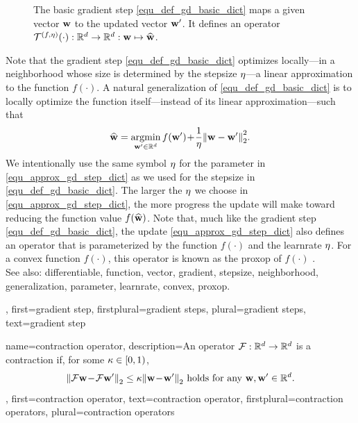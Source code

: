 {{\begin{figure}[H]
\begin{center}
\begin{tikzpicture}[scale=0.8]
				\end{tikzpicture}
			\end{center}
			\caption{The basic \gls{gradient} step \eqref{equ_def_gd_basic_dict} maps a given \gls{vector} $\weights$ 
			to the updated \gls{vector} $\weights'$. It defines an operator 
			$\mathcal{T}^{(f,\lrate)}(\cdot): \mathbb{R}^{\nrfeatures} \rightarrow \mathbb{R}^{\nrfeatures}:
			 \weights \mapsto \widehat{\weights}$.}
			\label{fig_basic_GD_step_single_dict}
		\end{figure}
		Note that the \gls{gradient} step \eqref{equ_def_gd_basic_dict} optimizes locally—in a \gls{neighborhood} whose size is 
		determined by the \gls{stepsize} $\lrate$—a linear approximation 
		to the \gls{function} $f(\cdot)$. A natural \gls{generalization} of \eqref{equ_def_gd_basic_dict} is to locally 
		optimize the \gls{function} itself—instead of its linear approximation—such that
		\begin{align} 
		\label{equ_approx_gd_step_dict}
		\widehat{\weights} = \argmin_{\weights' \in \mathbb{R}^{\dimlocalmodel}} f(\weights')\!+\!\frac{1}{\lrate}\normgeneric{\weights-\weights'}{2}^2. 
		\end{align}
		We intentionally use the same symbol $\lrate$ for the \gls{parameter} in \eqref{equ_approx_gd_step_dict} 
		as we used for the \gls{stepsize} in \eqref{equ_def_gd_basic_dict}. The larger the $\lrate$ we choose in 
		\eqref{equ_approx_gd_step_dict}, the more progress the update will make toward reducing the 
		\gls{function} value $f(\widehat{\weights})$. Note that, much like the \gls{gradient} step \eqref{equ_def_gd_basic_dict}, 
		the update \eqref{equ_approx_gd_step_dict} also defines an operator 
		that is parameterized by the \gls{function} $f(\cdot)$ and the \gls{learnrate} $\lrate$. For a \gls{convex} \gls{function}  
		$f(\cdot)$, this operator is known as the \gls{proxop} of $f(\cdot)$ \cite{ProximalMethods}. 
					\\ 
		See also: \gls{differentiable}, \gls{function}, \gls{vector}, \gls{gradient}, \gls{stepsize}, \gls{neighborhood}, \gls{generalization}, \gls{parameter}, \gls{learnrate}, \gls{convex}, \gls{proxop}.},
	first={gradient step},
	firstplural={gradient steps},
	plural={gradient steps},
	text={gradient step}
}

{name={contraction operator},
	description={An operator $\fixedpointop: \mathbb{R}^{\nrfeatures} \rightarrow \mathbb{R}^{\nrfeatures}$
		is a contraction if, for some $\contractfac \in [0,1)$,
		\begin{equation} 
			\nonumber
			\normgeneric{ \fixedpointop \weights\!-\!\fixedpointop \weights'}{2}  \leq  \contractfac	\normgeneric{\weights\!-\!\weights'}{2} \mbox{ holds for any } \weights,\weights' \in \mathbb{R}^{\nrfeatures}.
		\end{equation}
	},
	first={contraction operator},
	text={contraction operator}, 
	firstplural={contraction operators}, 
	plural={contraction operators}
}
	

